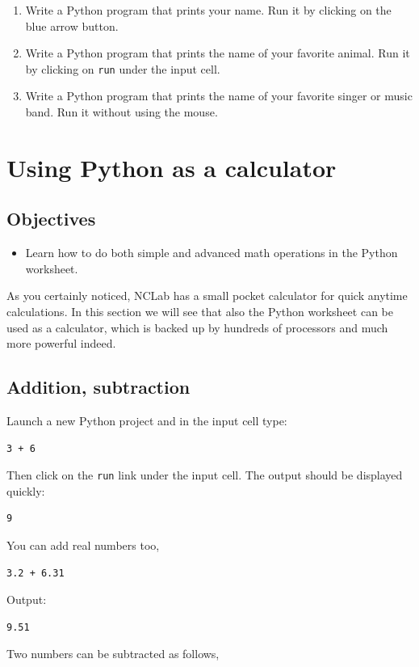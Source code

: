 \documentclass[article,A4,12pt]{llncs}
\begin{document}
\begin{enumerate}
\item Write a Python program that prints your name. Run it by clicking on the blue arrow button.
\item Write a Python program that prints the name of your favorite animal. 
      Run it by clicking on {\tt run} under the input cell.
\item Write a Python program that prints the name of your favorite singer 
      or music band. Run it without using the mouse.
\end{enumerate}

\section{Using Python as a calculator}

\subsection{Objectives}

\begin{itemize}
\item Learn how to do both simple and advanced math operations in the Python worksheet.
\end{itemize}
As you certainly noticed, NCLab has a small pocket calculator for quick anytime 
calculations. In this section we will see that also the Python worksheet can be 
used as a calculator, which is backed up by hundreds of processors and much more powerful indeed.

\subsection{Addition, subtraction}

Launch a new Python project and in the input cell type:

\begin{verbatim}
3 + 6
\end{verbatim}
Then click on the {\tt run} link under the input cell. The output should be displayed quickly:

\begin{verbatim}
9
\end{verbatim}
You can add real numbers too,
\begin{verbatim}
3.2 + 6.31
\end{verbatim}
Output:

\begin{verbatim}
9.51
\end{verbatim}
Two numbers can be subtracted as follows,
\end{document}
